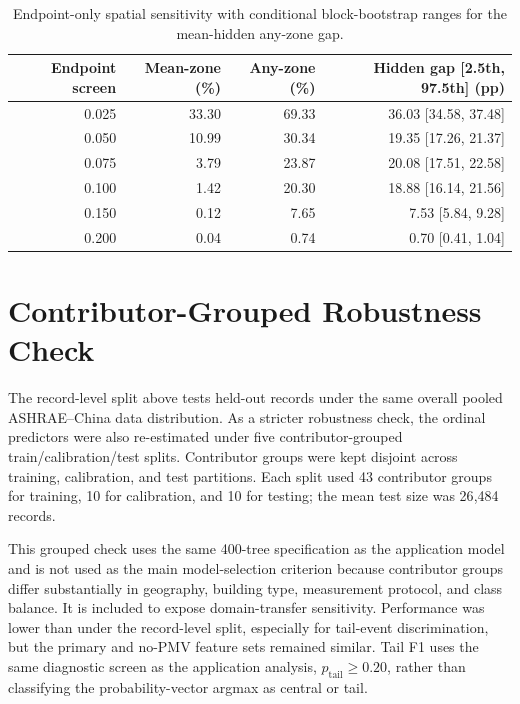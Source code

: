 \documentclass[11pt]{article}
\begin{document}
\begin{table}[htbp]
\centering
\caption{Endpoint-only spatial sensitivity with conditional block-bootstrap ranges for the mean-hidden any-zone gap.}
\label{tab:supp_endpoint_panel}
\footnotesize
\begin{tabular}{rrrr}
\toprule
Endpoint screen & Mean-zone (\%) & Any-zone (\%) & Hidden gap [2.5th, 97.5th] (pp) \\
\midrule
0.025 & 33.30 & 69.33 & 36.03 [34.58, 37.48] \\
0.050 & 10.99 & 30.34 & 19.35 [17.26, 21.37] \\
0.075 & 3.79 & 23.87 & 20.08 [17.51, 22.58] \\
0.100 & 1.42 & 20.30 & 18.88 [16.14, 21.56] \\
0.150 & 0.12 & 7.65 & 7.53 [5.84, 9.28] \\
0.200 & 0.04 & 0.74 & 0.70 [0.41, 1.04] \\
\bottomrule
\end{tabular}
\end{table}

\section{Contributor-Grouped Robustness Check}

The record-level split above tests held-out records under the same overall pooled ASHRAE--China data distribution. As a stricter robustness check, the ordinal predictors were also re-estimated under five contributor-grouped train/calibration/test splits. Contributor groups were kept disjoint across training, calibration, and test partitions. Each split used 43 contributor groups for training, 10 for calibration, and 10 for testing; the mean test size was 26{,}484 records.

This grouped check uses the same 400-tree specification as the application model and is not used as the main model-selection criterion because contributor groups differ substantially in geography, building type, measurement protocol, and class balance. It is included to expose domain-transfer sensitivity. Performance was lower than under the record-level split, especially for tail-event discrimination, but the primary and no-PMV feature sets remained similar. Tail F1 uses the same diagnostic screen as the application analysis, \(p_{\mathrm{tail}}\ge0.20\), rather than classifying the probability-vector argmax as central or tail.
\end{document}
